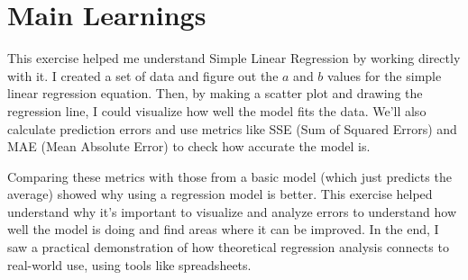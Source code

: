 \documentclass{article}
\begin{document}
\thispagestyle{empty}

\titleBC




\section{Main Learnings}

This exercise helped me understand Simple Linear Regression by working directly with it. I created a set of data and figure out the $a$ and $b$ values for the simple linear regression equation. Then, by making a scatter plot and drawing the regression line, I could visualize how well the model fits the data. We'll also calculate prediction errors and use metrics like SSE (Sum of Squared Errors) and MAE (Mean Absolute Error) to check how accurate the model is.

Comparing these metrics with those from a basic model (which just predicts the average) showed why using a regression model is better. This exercise helped understand why it's important to visualize and analyze errors to understand how well the model is doing and find areas where it can be improved. In the end, I saw a practical demonstration of how theoretical regression analysis connects to real-world use, using tools like spreadsheets.
\end{document}
